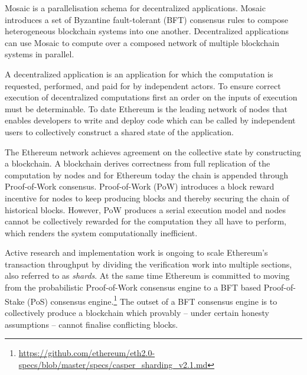 \documentclass[12pt,a4paper]{article}
\begin{document}
Mosaic is a parallelisation schema for decentralized applications.
Mosaic introduces a set of Byzantine fault-tolerant (BFT) consensus rules to compose heterogeneous blockchain systems into one another.
Decentralized applications can use Mosaic to compute over a composed network of multiple blockchain systems in parallel.

A decentralized application is an application for which the computation is requested, performed, and paid for by independent actors.
To ensure correct execution of decentralized computations first an order on the inputs of execution must be determinable.
To date Ethereum is the leading network
of nodes that enables developers to write and deploy code which can be called by independent users to collectively construct a shared state of the application.

The Ethereum network achieves agreement on the collective state by constructing a blockchain.
A blockchain derives correctness from full replication of the computation by nodes and for Ethereum today the chain is appended through Proof-of-Work consensus.
Proof-of-Work (PoW) introduces a block reward incentive for nodes to keep producing blocks and thereby securing the chain of historical blocks.
However, PoW produces a serial execution model and nodes cannot be collectively rewarded for the computation they all have to perform, which renders the system computationally inefficient\cite{verifiersdilemma}.

Active research and implementation work is ongoing to scale Ethereum's transaction throughput by dividing the verification work into multiple sections, also referred to as \emph{shards}.
At the same time Ethereum is committed to moving from the probabilistic Proof-of-Work consensus engine to a BFT based Proof-of-Stake (PoS) consensus engine.\footnote{
	\url{https://github.com/ethereum/eth2.0-specs/blob/master/specs/casper_sharding_v2.1.md}
}
The outset of a BFT consensus engine is to collectively produce a blockchain which provably -- under certain honesty assumptions -- cannot finalise conflicting blocks.

\end{document}

